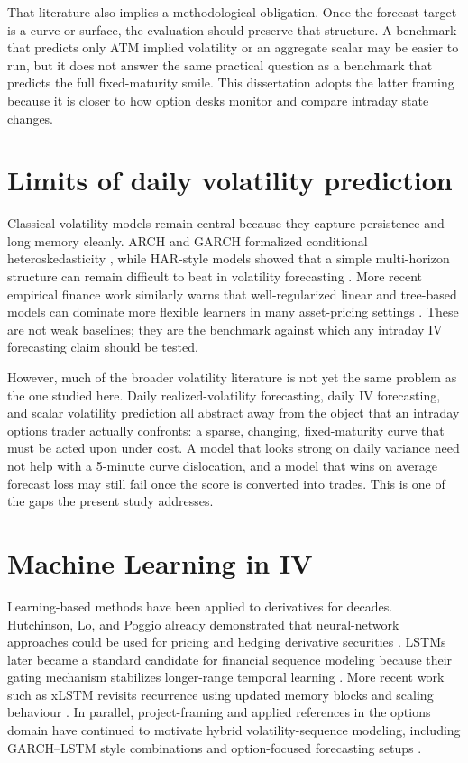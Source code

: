 \documentclass[12pt]{report}
\begin{document}
That literature also implies a methodological obligation. Once the forecast target is a curve or surface, the evaluation should preserve that structure. A benchmark that predicts only ATM implied volatility or an aggregate scalar may be easier to run, but it does not answer the same practical question as a benchmark that predicts the full fixed-maturity smile. This dissertation adopts the latter framing because it is closer to how option desks monitor and compare intraday state changes.

\section{Limits of daily volatility prediction}
Classical volatility models remain central because they capture persistence and long memory cleanly. ARCH and GARCH formalized conditional heteroskedasticity \citep{engle1982,bollerslev1986}, while HAR-style models showed that a simple multi-horizon structure can remain difficult to beat in volatility forecasting \citep{corsi2009}. More recent empirical finance work similarly warns that well-regularized linear and tree-based models can dominate more flexible learners in many asset-pricing settings \citep{gu2020,heaton2017}. These are not weak baselines; they are the benchmark against which any intraday IV forecasting claim should be tested.

However, much of the broader volatility literature is not yet the same problem as the one studied here. Daily realized-volatility forecasting, daily IV forecasting, and scalar volatility prediction all abstract away from the object that an intraday options trader actually confronts: a sparse, changing, fixed-maturity curve that must be acted upon under cost. A model that looks strong on daily variance need not help with a 5-minute curve dislocation, and a model that wins on average forecast loss may still fail once the score is converted into trades. This is one of the gaps the present study addresses.

\section{Machine Learning in IV}
Learning-based methods have been applied to derivatives for decades. Hutchinson, Lo, and Poggio already demonstrated that neural-network approaches could be used for pricing and hedging derivative securities \citep{hutchinson1994}. LSTMs later became a standard candidate for financial sequence modeling because their gating mechanism stabilizes longer-range temporal learning \citep{hochreiter1997,fischer2018}. More recent work such as xLSTM revisits recurrence using updated memory blocks and scaling behaviour \citep{beck2024xlstm}. In parallel, project-framing and applied references in the options domain have continued to motivate hybrid volatility-sequence modeling, including GARCH--LSTM style combinations and option-focused forecasting setups \citep{hull2019framing,sullivan2019lstm,zhao2024garchlstm}.
\end{document}
